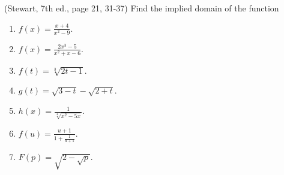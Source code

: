 (Stewart, 7th ed., page 21, 31-37) Find the implied domain of the function
\begin{multicols}{2}
\begin{enumerate}
\item $f(x)=\frac{x+4}{x^2-9}$.
\item $f(x)=\frac{2x^3-5}{x^2+x-6}$.
\item $f(t)=\sqrt[3]{2t-1}$.
\item $g(t)=\sqrt{3-t}-\sqrt{2+t}$.
\item $h(x)=\frac{1}{\sqrt[4]{x^2-5x}}$.
\item $f(u)=\frac{u+1}{1+\frac{1}{u+1}}$.
\item $F(p)=\sqrt{2-{\sqrt{p}}}$.
\end{enumerate}
\end{multicols}